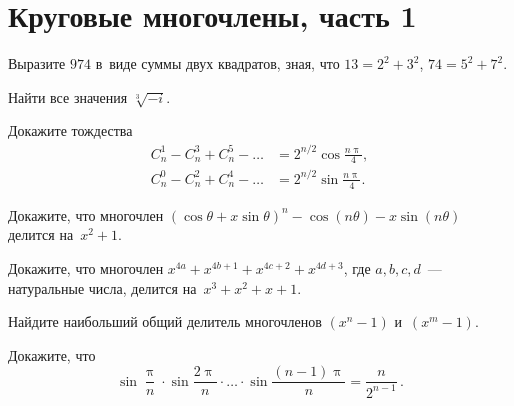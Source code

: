 
\section*{Круговые многочлены, часть 1}



\begingroup
    \ifdefined\mathup
        \def\piconst{\mathup{\pi}}%
    \else
        \def\piconst{\uppi}%
    \fi

\begin{problems}

Выразите $974$ в~виде суммы двух квадратов, зная, что $13 = 2 ^ 2 + 3 ^ 2$,
$74 = 5^2 + 7^2$.

\item
Найти все значения $\sqrt[3]{-i}$.

\item
Докажите тождества
\begin{align*}
    C_{n}^{1} - C_{n}^{3} + C_{n}^{5} - \ldots
& =
    2^{n/2} \cos \frac{n \piconst}{4}
, \\
    C_{n}^{0} - C_{n}^{2} + C_{n}^{4} - \ldots
& =
    2^{n/2} \sin \frac{n \piconst}{4}
. \end{align*}

\item
Докажите, что многочлен
\(
    (\cos\theta + x \sin\theta)^{n}
    - \cos(n \theta) - x \sin(n \theta)
\) делится на~$x^2 + 1$.

\item
Докажите, что многочлен
\(
    x^{4a} + x^{4b + 1} + x^{4c + 2} + x^{4d + 3}
\), где $a, b, c, d$~--- натуральные числа, делится на~$x^3 + x^2 + x + 1$.

\item
Найдите наибольший общий делитель многочленов $(x^{n} - 1)$ и~$(x^{m} - 1)$.

\item
Докажите, что
\[
    \sin \frac{\piconst}{n} \cdot \sin \frac{2 \piconst}{n}
    \cdot \ldots \cdot
    \sin \frac{(n - 1) \piconst}{n}
=
    \frac{n}{2^{n-1}}
\, . \]

\end{problems}

